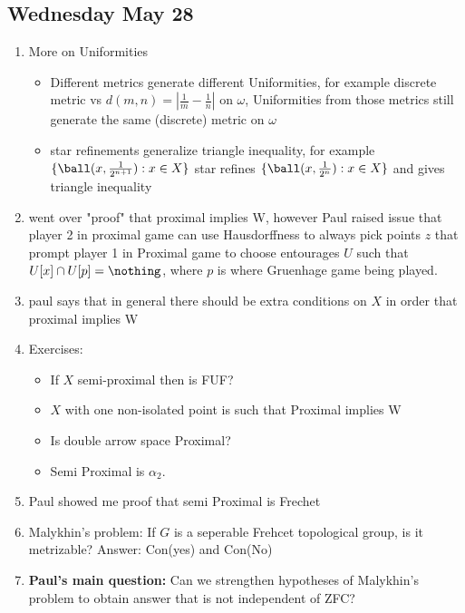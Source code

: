 \documentclass{article}
\begin{document}
\subsection*{Wednesday May 28}
\begin{enumerate}
    \item More on Uniformities 
    \begin{itemize}
        \item Different metrics generate different Uniformities, for example discrete metric vs \(d(m, n) = |\frac{1}{m} - \frac{1}{n}|\) on \(\omega\), Uniformities from those metrics still generate the same (discrete) metric on \(\omega\)
        \item star refinements generalize triangle inequality, for example \(\{\ball(x, \frac{1}{2^{n + 1}}): x \in X\}\) star refines \(\{\ball(x, \frac{1}{2^n}): x \in X\}\) and gives triangle inequality
    \end{itemize}
    \item went over "proof" that proximal implies W, however Paul raised issue that player 2 in proximal game can use Hausdorffness to always pick points \(z\) that prompt player 1 in Proximal game to choose entourages \(U\) such that \(U[x] \cap U[p] = \nothing\), where \(p\) is where Gruenhage game being played. 
    \item paul says that in general there should be extra conditions on \(X\) in order that proximal implies W
    \item Exercises:
    \begin{itemize}
        \item If \(X\) semi-proximal then is FUF?
        \item \(X\) with one non-isolated point is such that Proximal implies W
        \item Is double arrow space Proximal?
        \item Semi Proximal is \(\alpha_2\).
    \end{itemize}
    \item Paul showed me proof that semi Proximal is Frechet
    \item Malykhin's problem: If \(G\) is a seperable Frehcet topological group, is it metrizable? Answer: Con(yes) and Con(No)
    \item \textbf{Paul's main question:} Can we strengthen hypotheses of Malykhin's problem to obtain answer that is not independent of ZFC?
\end{enumerate}
\end{document}
